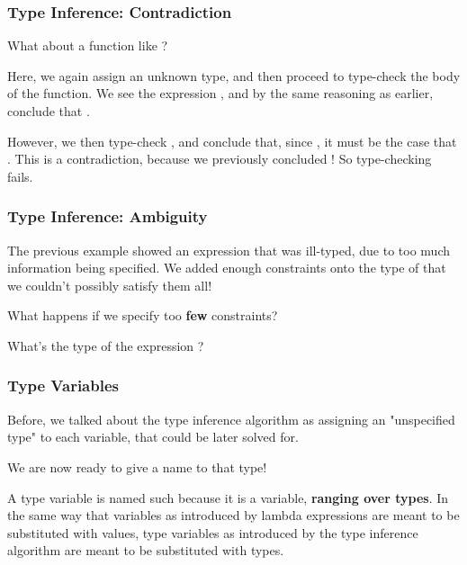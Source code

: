 \documentclass[aspectratio=169, handout]{beamer}
\begin{document}
\begin{frame}[fragile]
  \frametitle{Type Inference: Contradiction}

  What about a function like ?

  \pause
  \vspace{\fill}

  Here, we again assign  an unknown type, and then proceed
  to type-check the body of the function. We see the expression
  , and by the same reasoning as earlier, conclude that
  .

  \pause
  \vspace{\fill}

  However, we then type-check , and conclude that,
  since , it must be the case
  that . This is a contradiction, because we
  previously concluded ! So type-checking fails.
\end{frame}

\begin{frame}[fragile]
  \frametitle{Type Inference: Ambiguity}

  The previous example showed an expression that was ill-typed,
  due to too much information being specified. We added enough
  constraints onto the type of  that we couldn't possibly
  satisfy them all!

  \pause
  \vspace{\fill}

  What happens if we specify too \textbf{few} constraints?

  \pause
  \vspace{\fill}

  What's the type of the expression ?
\end{frame}


\begin{frame}[fragile]
  \frametitle{Type Variables}

  Before, we talked about the type inference algorithm as assigning an
  "unspecified type" to each variable, that could be later solved for.

  \pause
  \vspace{\fill}

  We are now ready to give a name to that type!

  \pause
  \vspace{\fill}


  \pause
  \vspace{\fill}

  A type variable is named such because it is a variable, \textbf{ranging
  over types}. In the same way that variables as introduced by lambda expressions
  are meant to be substituted with values, type variables as introduced by
  the type inference algorithm are meant to be substituted with types.
\end{frame}
\end{document}
